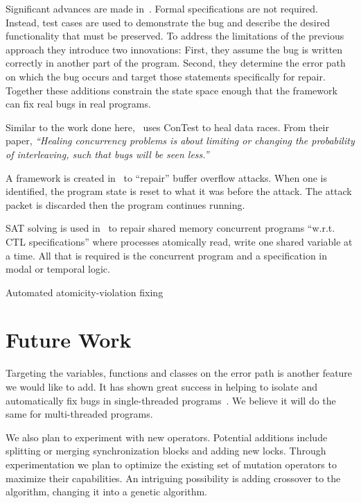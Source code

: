 \documentclass{llncs}
\begin{document}
Significant advances are made in~\cite{FNWG09, WNLF09, NWLF09, WFGN10,
GNFW11, LDFW12}. Formal specifications are not required. Instead, test cases are
used to demonstrate the bug and describe the desired functionality that must be
preserved. To address the limitations of the previous approach they introduce
two innovations: First, they assume the bug is written correctly in another
part of the program. Second, they determine the error path on which the bug
occurs and target those statements specifically for repair. Together these
additions constrain the state space enough that the framework can fix real bugs
in real programs.

Similar to the work done here,~\cite{KLT+07, LVK08} uses ConTest to heal data
races. From their paper, \textit{``Healing concurrency problems is about
limiting or changing the probability of interleaving, such that bugs will be
seen less.''}

A framework is created in~\cite{CB05} to ``repair'' buffer overflow attacks.
When one is identified, the program state is reset to what it was before the
attack. The attack packet is discarded then the program continues running.

SAT solving is used in~\cite{AY07}  to repair shared memory concurrent programs
``w.r.t. CTL specifications'' where processes atomically read, write one shared
variable at a time. All that is required is the concurrent program and a
specification in modal or temporal logic.

Automated atomicity-violation fixing~\cite{JSZL+11}

\section{Future Work}
\label{sec:future_work}

Targeting the variables, functions and classes on the error path is another
feature we would like to add. It has shown great success in helping to isolate
and automatically fix bugs in single-threaded programs~\cite{FNWG09, WNLF09, NWLF09, WFGN10, GNFW11, LDFW12}. We believe it will do the same for multi-threaded programs.

We also plan to experiment with new operators. Potential additions include
splitting or merging synchronization blocks and adding new locks. Through
experimentation we plan to optimize the existing set of mutation operators to
maximize their capabilities.  An intriguing possibility is adding crossover to
the algorithm, changing it into a genetic algorithm.
\end{document}
